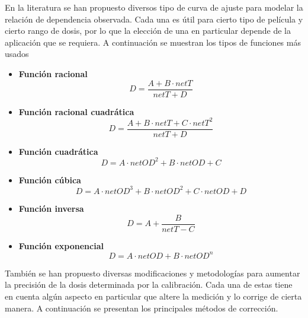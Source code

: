 En la literatura se han propuesto diversos tipo de curva de ajuste para modelar la relación de dependencia observada. Cada una es útil para cierto tipo de película y cierto rango de dosis, por lo que la elección de una en particular depende de la aplicación que se requiera. A continuación se muestran los tipos de funciones más usados\cite{Devic2016} \\

\begin{itemize}
\item\textbf{Función racional}\\
\begin{equation}
	D=\frac{A+B\cdot netT}{netT+D}
\end{equation}
\item\textbf{Función racional cuadrática}\\
\begin{equation}
D=\frac{A+B\cdot netT+C\cdot netT^2}{netT+D}
\end{equation}
\item\textbf{Función cuadrática}\\
\begin{equation}
D=A\cdot netOD^2+B\cdot netOD+C
\end{equation}
\item\textbf{Función cúbica}\\
\begin{equation}
D=A\cdot netOD^3+B\cdot netOD^2+C\cdot netOD +D 
\end{equation}

\item\textbf{Función inversa}\\
\begin{equation}
D=A+\frac{B}{netT-C}
\end{equation}

\item\textbf{Función exponencial}\\
\begin{equation}
D=A\cdot netOD+B\cdot netOD^n
\end{equation}
\end{itemize}

También se han propuesto diversas modificaciones y metodologías para aumentar la precisión de la dosis determinada por la calibración. Cada una de estas tiene en cuenta algún aspecto en particular que altere la medición y lo corrige de cierta manera. A continuación se presentan los principales métodos de corrección.\\


